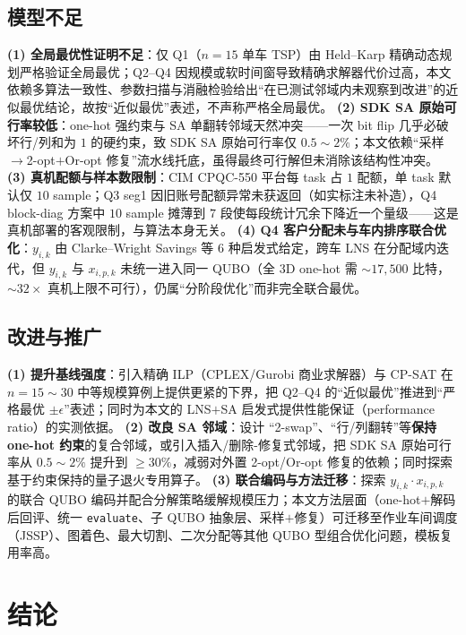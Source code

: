 \documentclass[UTF8,12pt,a4paper]{ctexart}
\begin{document}
\subsection{模型不足}

\textbf{(1) 全局最优性证明不足}：仅 Q1（$n=15$ 单车 TSP）由 Held--Karp 精确动态规划严格验证全局最优；Q2--Q4 因规模或软时间窗导致精确求解器代价过高，本文依赖多算法一致性、参数扫描与消融检验给出``在已测试邻域内未观察到改进''的近似最优结论，故按``近似最优''表述，不声称严格全局最优。
\textbf{(2) SDK SA 原始可行率较低}：one-hot 强约束与 SA 单翻转邻域天然冲突——一次 bit flip 几乎必破坏行/列和为 $1$ 的硬约束，致 SDK SA 原始可行率仅 $0.5\!\sim\!2\%$；本文依赖``采样$\to$2-opt$+$Or-opt 修复''流水线托底，虽得最终可行解但未消除该结构性冲突。
\textbf{(3) 真机配额与样本数限制}：CIM CPQC-550 平台每 task 占 $1$ 配额，单 task 默认仅 $10$ sample；Q3 seg1 因旧账号配额异常未获返回（如实标注未补造），Q4 block-diag 方案中 $10$ sample 摊薄到 $7$ 段使每段统计冗余下降近一个量级——这是真机部署的客观限制，与算法本身无关。
\textbf{(4) Q4 客户分配未与车内排序联合优化}：$y_{i,k}$ 由 Clarke--Wright Savings 等 6 种启发式给定，跨车 LNS 在分配域内迭代，但 $y_{i,k}$ 与 $x_{i,p,k}$ 未统一进入同一 QUBO（全 3D one-hot 需 $\sim 17{,}500$ 比特，$\sim 32\!\times$ 真机上限不可行），仍属``分阶段优化''而非完全联合最优。

\subsection{改进与推广}

\textbf{(1) 提升基线强度}：引入精确 ILP（CPLEX/Gurobi 商业求解器）与 CP-SAT 在 $n=15\!\sim\!30$ 中等规模算例上提供更紧的下界，把 Q2--Q4 的``近似最优''推进到``严格最优 $\pm \epsilon$''表述；同时为本文的 LNS$+$SA 启发式提供性能保证（performance ratio）的实测依据。
\textbf{(2) 改良 SA 邻域}：设计 ``2-swap''、``行/列翻转''等\textbf{保持 one-hot 约束}的复合邻域，或引入插入/删除-修复式邻域，把 SDK SA 原始可行率从 $0.5\!\sim\!2\%$ 提升到 $\ge 30\%$，减弱对外置 2-opt/Or-opt 修复的依赖；同时探索基于约束保持的量子退火专用算子。
\textbf{(3) 联合编码与方法迁移}：探索 $y_{i,k}\cdot x_{i,p,k}$ 的联合 QUBO 编码并配合分解策略缓解规模压力；本文方法层面（one-hot$+$解码后回评、统一 \texttt{evaluate}、子 QUBO 抽象层、采样$+$修复）可迁移至作业车间调度（JSSP）、图着色、最大切割、二次分配等其他 QUBO 型组合优化问题，模板复用率高。

\section{结论}
\end{document}
